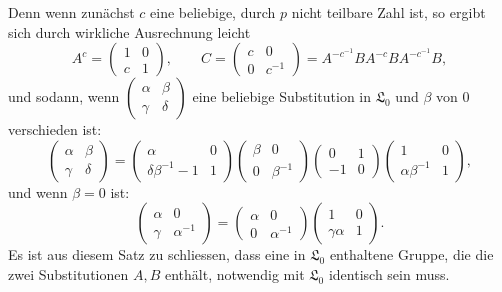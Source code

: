 \documentclass[11pt]{article}
\providecommand{\Lzero}{\mathfrak L_0}
\begin{document}
Denn wenn zunächst $c$ eine beliebige, durch $p$ nicht teilbare Zahl ist, so ergibt sich durch wirkliche Ausrechnung leicht
\begin{equation}
 A^c=\begin{pmatrix}1&0\\ c&1\end{pmatrix},
 \qquad
 C=\begin{pmatrix}c&0\\0&c^{-1}\end{pmatrix}
 =A^{-c^{-1}}BA^{-c}BA^{-c^{-1}}B,
\tag{11}
\end{equation}
und sodann, wenn $\begin{pmatrix}\alpha&\beta\\\gamma&\delta\end{pmatrix}$ eine beliebige Substitution in $\Lzero$ und $\beta$ von $0$ verschieden ist:
\begin{equation}
 \begin{pmatrix}\alpha&\beta\\\gamma&\delta\end{pmatrix}
 =\begin{pmatrix}\alpha&0\\ \delta\beta^{-1}-1&1\end{pmatrix}
 \begin{pmatrix}\beta&0\\0&\beta^{-1}\end{pmatrix}
 \begin{pmatrix}0&1\\-1&0\end{pmatrix}
 \begin{pmatrix}1&0\\ \alpha\beta^{-1}&1\end{pmatrix},
\tag{12}
\end{equation}
und wenn $\beta=0$ ist:
\begin{equation}
 \begin{pmatrix}\alpha&0\\\gamma&\alpha^{-1}\end{pmatrix}
 =\begin{pmatrix}\alpha&0\\0&\alpha^{-1}\end{pmatrix}
 \begin{pmatrix}1&0\\\gamma\alpha&1\end{pmatrix}.
\tag{13}
\end{equation}
Es ist aus diesem Satz zu schliessen, dass eine in $\Lzero$ enthaltene Gruppe, die die zwei Substitutionen $A,B$ enthält, notwendig mit $\Lzero$ identisch sein muss.
\end{document}
